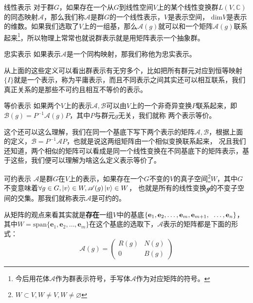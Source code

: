 \begin{define}{线性表示}
    对于群$G$，如果存在一个从$G$到线性空间$V$上的某个线性变换群$L(V,\mathbb{C})$的同态映射$\mathscr{A}$，那么我们称$\mathscr{A}$是群$G$的一个线性表示，$V$是表示空间，
    $\mathrm{dim}V$是表示的维数。如果我们选取了$V$上的一组基，那么$\mathscr{A}(g)$就可以和一个矩阵$\mathcal{A}(g)$联系起来\footnote[1]{今后用花体$\mathscr{A}$作为群表示符号，手写体$\mathcal{A}$作为对应矩阵的符号。}，所以物理上常常也就说群表示就是用矩阵表示一个抽象群。
\end{define}
\begin{define}{忠实表示}
    如果表示$\mathscr{A}$是一个同构映射，那我们称他为忠实表示。
\end{define}
从上面的这些定义可以看出群表示有无穷多个，比如把所有群元对应到恒等映射$\{I\}$就是一个表示，称为平庸表示，而且不同表示之间其实还可以相互联系，我们真正关系的是那些不可约且相互不等价的表示。
\begin{define}{等价表示}
    如果两个$V$上的表示$\mathscr{A},\mathscr{B}$可以由$V$上的一个非奇异变换$P$联系起来，即$\mathscr{B}(g)=P^{-1}\mathscr{A}(g)P$，其中$P$与群元$g$无关，我们就称
    两个表示等价。
\end{define}
这个还可以这么理解，我们在同一个基底下写下两个表示的矩阵$\mathcal{A},\mathcal{B}$，根据上面的定义，$\mathcal{B}=P^{-1}\mathcal{A}P$，也就是说这两组矩阵由一个相似变换联系起来，
况且我们还知道，两个相似的矩阵可以看成是同一个线性变换在不同基底下的矩阵表示，基于这些，我们便可以理解为啥这么定义表示等价了。
\begin{define}{可约表示}
    $\mathscr{A}$是群$G$在$V$上的表示，如果存在一个$G$不变的$V$的真子空间\footnote[1]{$W\subset V,W\neq V,W\neq \varnothing$}$W$，其中$G$不变意味着$\forall g\in G, \ket{v}\in W,\mathscr{A}(g)\ket{v}\in W$，
    也就是所有的线性变换$\mathscr{g}$的不变子空间的交集。那我们就称表示$\mathscr{A}$是可约的。
\end{define}
从矩阵的观点来看其实就是\textbf{存在}一组$V$中的基底$\left\{\mathbf{e}_1,\mathbf{e}_2,\ldots,\mathbf{e}_m,\mathbf{e}_{m+1},\right.\\\left.\ldots,\mathbf{e}_n\right\}$，其中$W=\mathrm{span}\{\mathbf{e}_1,\mathbf{e}_2,\ldots,\mathbf{e}_m\}$在这个基底的选取下，$\mathscr{A}$表示的矩阵都是下面的形式：
\begin{equation}
    \label{eq:D.2}
    \mathcal{A}(g)=\begin{pmatrix}
    R(g) &N(g) \\
     {0} & B(g)
   \end{pmatrix}
\end{equation}

